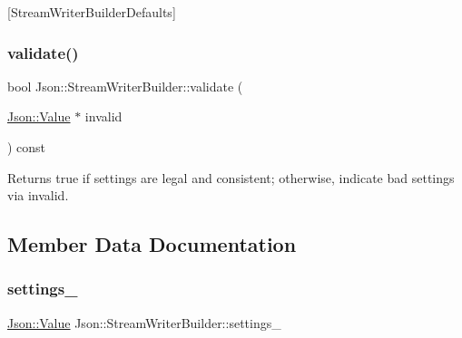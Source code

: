 \mbox{[}Stream\+Writer\+Builder\+Defaults\mbox{]} \mbox{\label{classJson_1_1StreamWriterBuilder_a12353b97766841db7d049da84658da09}} 
\subsubsection{\texorpdfstring{validate()}{validate()}}
{\footnotesize\ttfamily bool Json\+::\+Stream\+Writer\+Builder\+::validate (\begin{DoxyParamCaption}\item[{\hyperlink{classJson_1_1Value}{Json\+::\+Value} $\ast$}]{invalid }\end{DoxyParamCaption}) const}

\begin{DoxyReturn}{Returns}
true if \textquotesingle{}settings\textquotesingle{} are legal and consistent; otherwise, indicate bad settings via \textquotesingle{}invalid\textquotesingle{}. 
\end{DoxyReturn}


\subsection{Member Data Documentation}
\mbox{\label{classJson_1_1StreamWriterBuilder_a79bdf2e639a52f4e758c0b95bd1d3423}} 
\subsubsection{\texorpdfstring{settings\+\_\+}{settings\_}}
{\footnotesize\ttfamily \hyperlink{classJson_1_1Value}{Json\+::\+Value} Json\+::\+Stream\+Writer\+Builder\+::settings\+\_\+}

